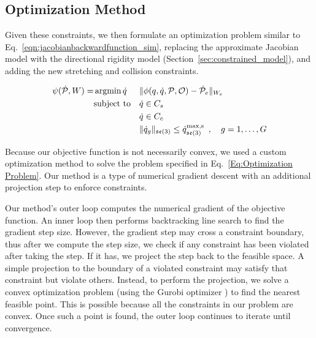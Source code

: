 \subsection{Optimization Method}

Given these constraints, we then formulate an optimization problem similar to Eq.~\eqref{eqn:jacobianbackwardfunction_sim}, replacing the approximate Jacobian model with the directional rigidity model (Section~\ref{sec:constrained_model}), and adding the new stretching and collision constraints.


\begin{equation}
\begin{aligned}
    \psi(\dot{\mathcal{P}}, W) = 
        & \operatorname*{argmin}{\dot{q}}
            & & \| \phi(q, \dot{q}, \mathcal{P}, \mathcal{O}) - \dot{\mathcal{P}}_e \|_{W_e} \\
        & \textrm{subject to}
            & & \dot{q} \in C_s\\
        &   & & \dot{q} \in C_c\\
        &   & & \| \dot{q}_g \|_{\mathfrak{se}(3)} \leq \dot{q}^\textrm{max,s}_{\mathfrak{se}(3)} \enspace, \quad g = 1, \dots, G
\end{aligned}
\label{Eq:Optimization Problem}
\end{equation}

Because our objective function is not necessarily convex, we used a custom optimization method to solve the problem specified in Eq.~\ref{Eq:Optimization Problem}. Our method is a type of numerical gradient descent with an additional projection step to enforce constraints.

Our method's outer loop computes the numerical gradient of the objective function. An inner loop then performs backtracking line search to find the gradient step size. However, the gradient step may cross a constraint boundary, thus after we compute the step size, we check if any constraint has been violated after taking the step. If it has, we project the step back to the feasible space. A simple projection to the boundary of a violated constraint may satisfy that constraint but violate others. Instead, to perform the projection, we solve a convex optimization problem (using the Gurobi optimizer \cite{Gurobi2016}) to find the nearest feasible point. This is possible because all the constraints in our problem are convex. Once such a point is found, the outer loop continues to iterate until convergence.

